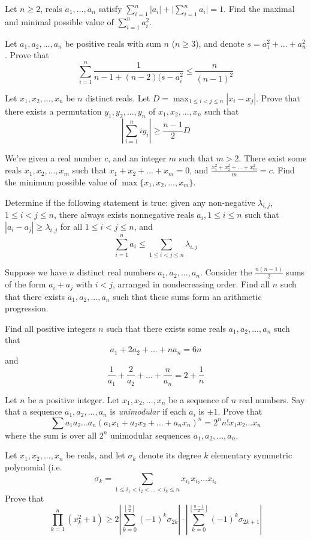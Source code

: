  {Let $n\ge 2$, reals $a_1,...,a_n$ satisfy $\sum_{i=1}^n |a_i| + \lvert \sum_{i=1}^n a_i\rvert = 1$. Find the maximal and minimal possible value of $\sum_{i=1}^n a_i^2$.}

 {Let $a_1,a_2,...,a_n$ be positive reals with sum $n$ ($n\ge 3$), and denote $s=a_1^2+...+a_n^2$. Prove that $$\sum_{i=1}^n \frac{1}{n-1+(n-2)(s-a_i^2} \le \frac{n}{(n-1)^2}$$}

 {Let $x_1,x_2,...,x_n$ be $n$ distinct reals. Let $D=\max_{1\le i<j\le n} |x_i-x_j|$. Prove that there exists a permutation $y_1,y_2,...,y_n$ of $x_1,x_2,...,x_n$ such that $$\left\lvert \sum_{i=1}^n iy_i \right\rvert \ge \frac{n-1}{2}D $$}

 {We're given a real number $c$, and an integer $m$ such that $m>2$. There exist some reals $x_1, x_2, ..., x_m$ such that $x_1 + x_2 + ... + x_m = 0$, and $\frac{x_1^2+x_2^2+...+x_m^2}m=c$. Find the minimum possible value of $\max\{x_1,x_2,...,x_m\}$.}

 {Determine if the following statement is true: given any non-negative $\lambda_{i,j}$, $1\le i<j\le n$, there always exists nonnegative reals $a_i, 1\le i\le n$ such that $|a_i-a_j|\ge \lambda_{i,j}$ for all $1\le i<j\le n$, and $$\sum_{i=1}^n a_i\le \sum_{1\le i<j\le n}\lambda_{i,j}$$}



 {Suppose we have $n$ distinct real numbers $a_1, a_2,..., a_n$. Consider the $\frac{n(n-1)}{2}$ sums of the form $a_i + a_j$ with $i<j$, arranged in nondecreasing order. Find all $n$ such that there exists $a_1, a_2, ..., a_n$ such that these sums form an arithmetic progression.}

 {Find all positive integers $n$ such that there exists some reals $a_1, a_2, ..., a_n$ such that
    \[a_1 + 2a_2 + ... + na_n = 6n\]
    and
    \[\frac1{a_1}+\frac2{a_2}+...+\frac{n}{a_n}=2+\frac1n\]}



 {Let $n$ be a positive integer. Let $x_1, x_2,..., x_n$ be a sequence of $n$ real numbers. Say that a sequence $a_1, a_2,..., a_n$ is
\textit{unimodular} if each $a_i$ is $\pm 1$. Prove that $$\sum a_1a_2...a_n(a_1x_1+a_2x_2+...+a_nx_n)^n= 2^nn!x_1x_2...x_n$$ where the sum is over all $2^n$ unimodular sequences $a_1,a_2,...,a_n$.}

 {Let $x_1,x_2,...,x_n$ be reals, and let $\sigma_k$ denote its degree $k$ elementary symmetric polynomial (i.e. $$\sigma_k=\sum_{1\le i_1<i_2<...<i_k\le n} x_{i_1}x_{i_2}...x_{i_k}$$
Prove that $$\prod_{k=1}^n (x_k^2+1) \ge 2\left\lvert \sum_{k=0}^{\left\lfloor \frac{n}{2}\right\rfloor} (-1)^k\sigma_{2k} \right\rvert\cdot \left\lvert \sum_{k=0}^{\left\lfloor \frac{n-1}{2}\right\rfloor} (-1)^k\sigma_{2k+1} \right\rvert$$}


